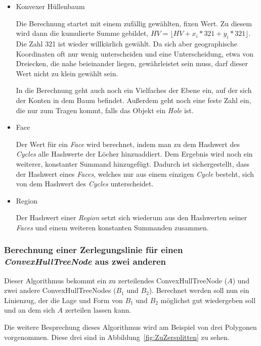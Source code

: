 \begin{itemize}
\item Konvexer Hüllenbaum

Die Berechnung startet mit einem zufällig  gewählten, fixen Wert. Zu diesem wird dann die kumulierte Summe gebildet, $HV=\lfloor HV+x_i*321+y_i*321\rfloor$. Die Zahl 321 ist wieder willkürlich gewählt. Da sich aber geographische Koordinaten oft nur wenig unterscheiden und eine Unterscheidung, etwa von Dreiecken, die nahe beieinander liegen, gewährleistet sein muss, darf dieser Wert nicht zu klein gewählt sein. 

In die Berechnung geht auch noch ein Vielfaches der Ebene ein, auf der sich der Konten in dem Baum  befindet. Außerdem geht noch eine feste Zahl ein, die nur zum Tragen kommt, falls das Objekt ein \textit{Hole} ist.

\item Face

Der Wert für ein \textit{Face} wird berechnet, indem man zu dem Hashwert des \textit{Cycles} alle Hashwerte der Löcher hinzuaddiert. Dem Ergebnis wird noch ein weiterer, konstanter Summand hinzugefügt. Dadurch ist sichergestellt, dass der Hashwert eines \textit{Faces}, welches nur aus einem einzigen \textit{Cycle} besteht, sich von dem Hashwert des \textit{Cycles} unterscheidet.

\item Region

Der Hashwert einer \textit{Region} setzt sich wiederum aus den Hashwerten seiner \textit{Faces} und einem weiteren konstanten Summanden zusammen.
\end{itemize}
\newpage
\subsubsection{Berechnung einer Zerlegungslinie für einen \textit{ConvexHullTreeNode} aus zwei anderen}\label{ZerteilungsAlgo}

Dieser Algorithmus bekommt ein zu zerteilendes ConvexHullTreeNode ($A$) und zwei andere ConvexHullTreeNodes ($B_1$ und $B_2$). Berechnet werden soll nun ein Linienzug, der die Lage und Form von $B_1$ und $B_2$ möglichst gut wiedergeben soll und an dem sich $A$ zerteilen lassen kann.

Die weitere Besprechung dieses Algorithmus wird am Beispiel von drei Polygonen vorgenommen. Diese drei sind in Abbildung~\vref{fig:ZuZersplitten} zu sehen.

